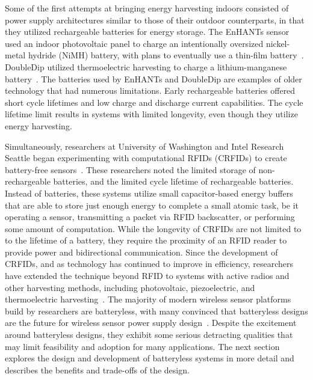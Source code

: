 Some of the first attempts at bringing energy harvesting indoors consisted of power supply architectures similar to those of their outdoor counterparts, in that they utilized rechargeable batteries for energy storage.
The EnHANTs sensor used an indoor photovoltaic panel to charge an intentionally oversized nickel-metal hydride (NiMH)
battery, with plans to eventually use a thin-film battery~\cite{gorlatova2009challenge,margolies2015energy}.
DoubleDip utilized thermoelectric harvesting to charge a lithium-manganese battery~\cite{martin2012doubledip}.
The batteries used by EnHANTs and DoubleDip are examples of older technology that had numerous limitations. 
Early rechargeable batteries offered short cycle lifetimes and low charge and discharge current capabilities.
The cycle lifetime limit results in systems with limited longevity, even though they utilize energy harvesting.

Simultaneously, researchers at University of Washington and Intel Research Seattle began experimenting with computational RFIDs (CRFIDs) to create battery-free sensors~\cite{sample2008design}.
These researchers noted the limited storage of non-rechargeable batteries, and the limited cycle lifetime of rechargeable batteries.
Instead of batteries, these systems utilize small capacitor-based energy buffers that are able to store just enough energy to complete a small atomic task, be it operating a sensor, transmitting a packet via RFID backscatter, or performing some amount of computation.
While the longevity of CRFIDs are not limited to to the lifetime of a battery, they require the proximity of an RFID reader to provide power and bidirectional communication.
Since the development of CRFIDs, and as technology has continued to improve in efficiency, researchers have extended the technique beyond RFID to systems with active radios and other harvesting methods, including photovoltaic, piezoelectric, and thermoelectric harvesting~\cite{yervaGrafting12, debruin2013monjolo, hesterFlicker17, colinReconfigurable18, nardello2019camaroptera}.
The majority of modern wireless sensor platforms build by researchers are batteryless, with many convinced that batteryless designs are the future for wireless sensor power supply design~\cite{hesterFlicker17,colinReconfigurable18,fraternali2018pible,truong2018capband,shukla2019skinnypower,hester2017future}.
Despite the excitement around batteryless designs, they exhibit some serious detracting qualities that may limit feasibility and adoption for many applications.
The next section explores the design and development of batteryless systems in more detail and describes the benefits and trade-offs of the design.

